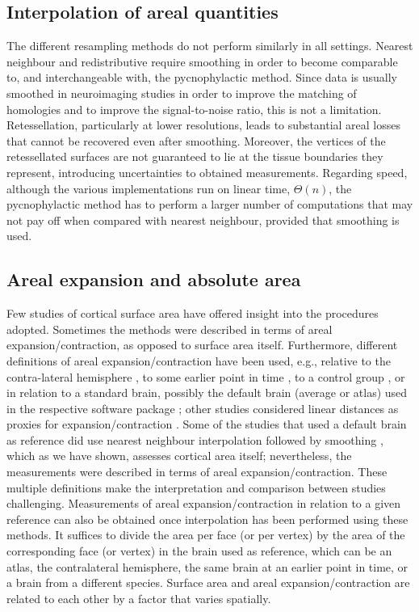 \subsection{Interpolation of areal quantities}

The different resampling methods do not perform similarly in all settings. Nearest neighbour and redistributive require smoothing in order to become comparable to, and interchangeable with, the pycnophylactic method. Since data is usually smoothed in neuroimaging studies in order to improve the matching of homologies and to improve the signal-to-noise ratio, this is not a limitation. Retessellation, particularly at lower resolutions, leads to substantial areal losses that cannot be recovered even after smoothing. Moreover, the vertices of the retessellated surfaces are not guaranteed to lie at the tissue boundaries they represent, introducing uncertainties to obtained measurements. Regarding speed, although the various implementations run on linear time, $\Theta(n)$, the pycnophylactic method has to perform a larger number of computations that may not pay off when compared with nearest neighbour, provided that smoothing is used.

\subsection{Areal expansion and absolute area}

Few studies of cortical surface area have offered insight into the procedures adopted. Sometimes the methods were described in terms of areal expansion/contraction, as opposed to surface area itself. Furthermore, different definitions of areal expansion/contraction have been used, e.g., relative to the contra-lateral hemisphere \citep{Lyttelton2009}, to some earlier point in time \citep{Hill2010}, to a control group \citep{Palaniyappan2011}, or in relation to a standard brain, possibly the default brain (average or atlas) used in the respective software package \citep{Joyner2009, Rimol2010_pnas, Rimol2012, Chen2011, Chen2012, Vuoksimaa2016}; other studies considered linear distances as proxies for expansion/contraction \citep{Sun2009_sr, Sun2009_mp}. Some of the studies that used a default brain as reference did use nearest neighbour interpolation followed by smoothing \citep{Joyner2009, Rimol2010_pnas, Rimol2012}, which as we have shown, assesses cortical area itself; nevertheless, the measurements were described in terms of areal expansion/contraction. These multiple definitions make the interpretation and comparison between studies challenging. Measurements of areal expansion/contraction in relation to a given reference can also be obtained once interpolation has been performed using these methods. It suffices to divide the area per face (or per vertex) by the area of the corresponding face (or vertex) in the brain used as reference, which can be an atlas, the contralateral hemisphere, the same brain at an earlier point in time, or a brain from a different species. Surface area and areal expansion/contraction are related to each other by a factor that varies spatially.

